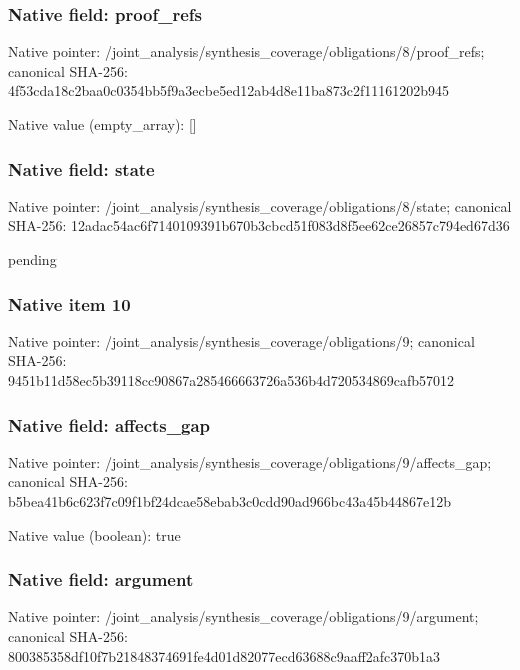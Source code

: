 \documentclass[10pt,a4paper]{article}
\begin{document}
\subsubsection{Native field: proof\_\allowbreak{}refs}
Native pointer: /joint\_\allowbreak{}analysis/synthesis\_\allowbreak{}coverage/obligations/8/proof\_\allowbreak{}refs; canonical SHA-256: 4f53cda18c2baa0c0354bb5f9a3ecbe5ed12ab4d8e11ba873c2f11161202b945

Native value (empty\_\allowbreak{}array): []

\subsubsection{Native field: state}
Native pointer: /joint\_\allowbreak{}analysis/synthesis\_\allowbreak{}coverage/obligations/8/state; canonical SHA-256: 12adac54ac6f7140109391b670b3cbcd51f083d8f5ee62ce26857c794ed67d36

\begingroup\raggedright\sloppy pending\par\endgroup

\subsubsection{Native item 10}
Native pointer: /joint\_\allowbreak{}analysis/synthesis\_\allowbreak{}coverage/obligations/9; canonical SHA-256: 9451b11d58ec5b39118cc90867a285466663726a536b4d720534869cafb57012

\subsubsection{Native field: affects\_\allowbreak{}gap}
Native pointer: /joint\_\allowbreak{}analysis/synthesis\_\allowbreak{}coverage/obligations/9/affects\_\allowbreak{}gap; canonical SHA-256: b5bea41b6c623f7c09f1bf24dcae58ebab3c0cdd90ad966bc43a45b44867e12b

Native value (boolean): true

\subsubsection{Native field: argument}
Native pointer: /joint\_\allowbreak{}analysis/synthesis\_\allowbreak{}coverage/obligations/9/argument; canonical SHA-256: 800385358df10f7b21848374691fe4d01d82077ecd63688c9aaff2afc370b1a3
\end{document}
